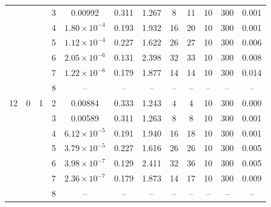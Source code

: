 \documentclass[12pt]{article}
\begin{document}
\begin{table}
\begin{ruledtabular}
\begin{tabular}{cccccccccccc}
 & &  & 3 & 0.00992 & 0.311 & 1.267 & 8 & 11 & 10 & 300 & 0.001 \\
 & &  & 4 & $1.80\times10^{-4}$ & 0.193 & 1.932 & 16 & 20 & 10 & 300 & 0.001 \\
 & &  & 5 & $1.12\times10^{-4}$ & 0.227 & 1.622 & 26 & 27 & 10 & 300 & 0.006 \\
 & &  & 6 & $2.05\times10^{-6}$ & 0.131 & 2.398 & 32 & 33 & 10 & 300 & 0.008 \\
 & &  & 7 & $1.22\times10^{-6}$ & 0.179 & 1.877 & 14 & 14 & 10 & 300 & 0.014 \\
 & &  & 8 & -- & -- & -- & -- & -- & -- & -- & -- \\
\hline
12 & 0 & 1 & 2 & 0.00884 & 0.333 & 1.243 & 4 & 4 & 10 & 300 & 0.000 \\
 & &  & 3 & 0.00589 & 0.311 & 1.263 & 8 & 8 & 10 & 300 & 0.001 \\
 & &  & 4 & $6.12\times10^{-5}$ & 0.191 & 1.940 & 16 & 18 & 10 & 300 & 0.001 \\
 & &  & 5 & $3.79\times10^{-5}$ & 0.227 & 1.616 & 26 & 26 & 10 & 300 & 0.005 \\
 & &  & 6 & $3.98\times10^{-7}$ & 0.129 & 2.411 & 32 & 36 & 10 & 300 & 0.005 \\
 & &  & 7 & $2.36\times10^{-7}$ & 0.179 & 1.873 & 14 & 17 & 10 & 300 & 0.009 \\
 & &  & 8 & -- & -- & -- & -- & -- & -- & -- & --
\end{tabular}
\end{ruledtabular}
\end{table}
\end{document}
